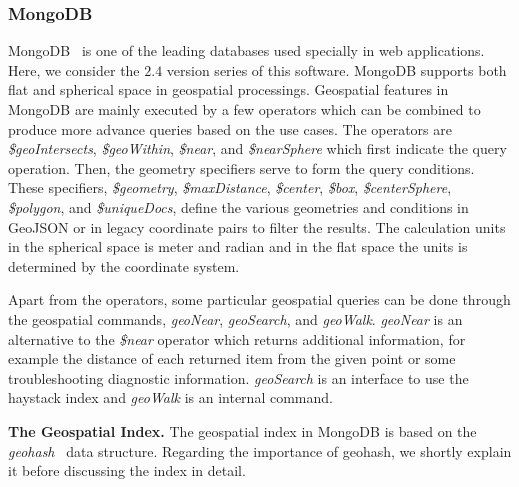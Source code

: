 \documentclass[a4paper,12pt]{article}
\begin{document}
\subsubsection{MongoDB}
\label{mongo}
MongoDB~\cite{mongogeneral2010,mongoinaction2011} is one of the leading databases used specially in web applications. Here, we consider the $2.4$ version series of this software. MongoDB supports both flat and spherical space in geospatial processings. Geospatial features in MongoDB are mainly executed by a few operators which can be combined to produce more advance queries based on the use cases. 
The operators are \textit{\$geoIntersects}, \textit{\$geoWithin}, \textit{\$near}, and \textit{\$nearSphere} which first indicate the query operation. Then, the geometry specifiers serve to form the query conditions. These specifiers, \textit{\$geometry}, \textit{\$maxDistance}, \textit{\$center}, \textit{\$box}, \textit{\$centerSphere}, \textit{\$polygon}, and \textit{\$uniqueDocs}, define the various geometries and conditions in GeoJSON or in legacy coordinate pairs to filter the results. The calculation units in the spherical space is meter and radian and in the flat space the units is determined by the coordinate system. 

Apart from the operators, some particular geospatial queries can be done through the geospatial commands, 
\textit{geoNear}, \textit{geoSearch}, and \textit{geoWalk}. \textit{geoNear} is an alternative to the \textit{\$near} operator which returns additional information, for example the distance of each returned item from the given point or some troubleshooting diagnostic information. \textit{geoSearch} is an interface to use the haystack index and \textit{geoWalk} is an internal command.

\textbf{The Geospatial Index.}
The geospatial index in MongoDB is based on the \textit{geohash}~\cite{www/geohash} data structure. Regarding the importance of geohash, we shortly explain it before discussing the index in detail.
\end{document}
